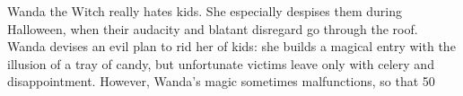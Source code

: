 Wanda the Witch really hates kids. She especially despises them during Halloween, when their audacity and blatant disregard go through the roof. Wanda devises an evil plan to rid her of kids: she builds a magical entry with the illusion of a tray of candy, but unfortunate victims leave only with celery and disappointment. However, Wanda's magic sometimes malfunctions, so that 50%
